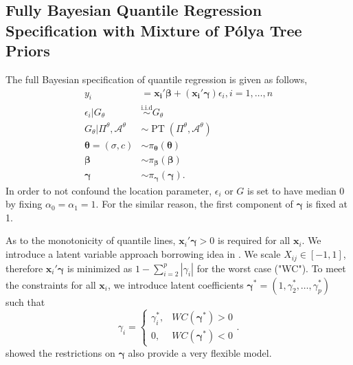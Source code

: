 \documentclass[12pt]{article}
\newcommand{\polya}{P\'{o}lya}
\newcommand{\iid}{\stackrel{\mbox{i.i.d}}{\sim}}
\DeclareMathOperator{\pt}{PT}
\begin{document}
\subsection{Fully Bayesian Quantile Regression Specification with
  Mixture of \polya{} Tree Priors}
The full Bayesian specification of quantile regression is given as
follows,
\begin{align*}
  y_i& = \bm{x_i'\beta} + (\bm{x_i'\gamma}) \epsilon_{i}, i = 1,
  \ldots,
  n \\
  \epsilon_i |G_{\theta} & \iid G_{\theta} \\
  G_{\theta}|\Pi^{\theta}, \mathcal{A}^{\theta} & \sim \pt
  (\Pi^{\theta}, \mathcal{A}^{\theta}) \\
  \bm{\theta} = (\sigma, c) & \sim \pi_{\bm \theta}(\bm \theta) \\
  \bm{\beta} & \sim \pi_{\bm \beta}(\bm \beta)\\
  \bm{\gamma} &\sim \pi_{\bm \gamma}(\bm \gamma).
\end{align*}
In order to not confound the location parameter, $\epsilon_i $ or $G$
is set to have median 0 by fixing $\alpha_0=\alpha_1 = 1$. For the
similar reason, the first component of $\bm{\gamma}$ is fixed at 1.

As to the monotonicity of quantile lines, $\bm x_i\prime \bm \gamma > 0$ is required for all $\bm x_i$.
We introduce a latent variable approach borrowing idea in \citet{reich2011, reich2012, reich2013}.
We scale $X_{ij} \in [-1, 1]$, therefore $\bm x_i\prime \bm \gamma$ is minimized as $1 - \sum_{i = 2}^{p} |\gamma_i|$ for the worst case ("WC").
To meet the constraints for all $\bm x_i$, we introduce latent coefficients $\bm \gamma^{*} = (1, \gamma_2^{*}, \ldots, \gamma_p^{*})$ such that
\begin{displaymath}
\gamma_i =
\begin{cases}
\gamma_i^{*}, & WC(\bm \gamma^{*}) > 0 \\
0,            & WC(\bm \gamma^{*} ) < 0
\end{cases}.
\end{displaymath}
\citet{reich2013} showed the restrictions on $\bm \gamma$ also provide a very flexible model.
\end{document}
